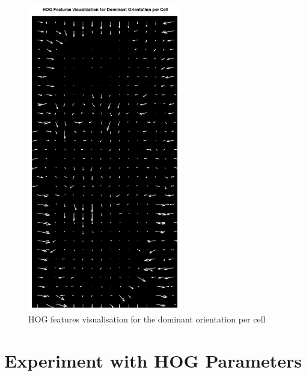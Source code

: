 \documentclass[a4paper]{article}
\begin{document}
\begin{minipage}{0.49\textwidth}
\begin{figure}[H]
    \centering
    \includegraphics[width=0.6\textwidth]{./images/1_hog_features.png}
    \caption{HOG features visualisation for the dominant orientation per cell}
\end{figure}
\end{minipage}

\section{Experiment with HOG Parameters}
\end{document}
